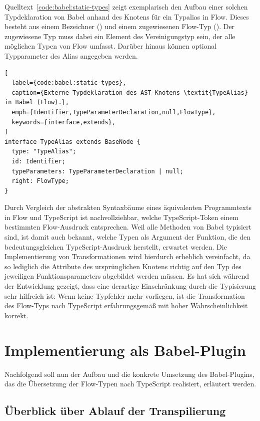 Quelltext~\ref{code:babel:static-types} zeigt exemplarisch den Aufbau einer solchen Typdeklaration von Babel anhand des Knotens für ein Typalias in Flow. Dieses besteht aus einem Bezeichner () und einem zugewiesenen Flow-Typ (). Der zugewiesene Typ muss dabei ein Element des Vereinigungstyp  sein, der alle möglichen Typen von Flow umfasst. Darüber hinaus können optional Typparameter des Alias angegeben werden.

\begin{lstlisting}[
  label={code:babel:static-types},
  caption={Externe Typdeklaration des AST-Knotens \textit{TypeAlias} in Babel (Flow).},
  emph={Identifier,TypeParameterDeclaration,null,FlowType},
  keywords={interface,extends},
]
interface TypeAlias extends BaseNode {
  type: "TypeAlias";
  id: Identifier;
  typeParameters: TypeParameterDeclaration | null;
  right: FlowType;
}
\end{lstlisting}

Durch Vergleich der abstrakten Syntaxbäume eines äquivalenten Programmtexts in Flow und TypeScript ist nachvollziehbar, welche TypeScript-Token einem bestimmten Flow-Ausdruck entsprechen. Weil alle Methoden von Babel typisiert sind, ist damit auch bekannt, welche Typen als Argument der Funktion, die den bedeutungsgleichen TypeScript-Ausdruck herstellt, erwartet werden. Die Implementierung von Transformationen wird hierdurch erheblich vereinfacht, da so lediglich die Attribute des ursprünglichen Knotens richtig auf den Typ des jeweiligen Funktionsparameters abgebildet werden müssen. Es hat sich während der Entwicklung gezeigt, dass eine derartige Einschränkung durch die Typisierung sehr hilfreich ist: Wenn keine Typfehler mehr vorliegen, ist die Transformation des Flow-Typs nach TypeScript erfahrungsgemäß mit hoher Wahrscheinlichkeit korrekt.

\section{Implementierung als Babel-Plugin}
\label{sec:implementation}

Nachfolgend soll nun der Aufbau und die konkrete Umsetzung des Babel-Plugins, das die Übersetzung der Flow-Typen nach TypeScript realisiert, erläutert werden.

\subsection{Überblick über Ablauf der Transpilierung}

